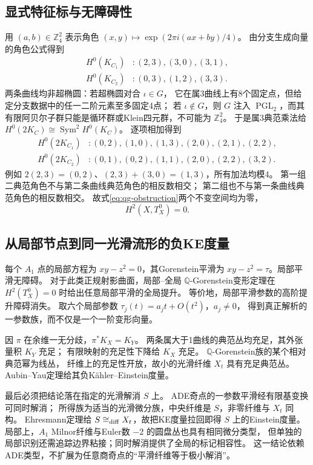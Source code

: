 \documentclass[UTF8,a4paper,11pt,fontset=fandol]{ctexart}
\numberwithin{equation}{section}
\theoremstyle{definition}
\newcommand{\Z}{\mathbb Z}
\begin{document}
\subsection{显式特征标与无障碍性}
用 $(a,b)\in\Z_4^2$ 表示角色
$(x,y)\mapsto\exp(2\pi i(ax+by)/4)$。
由分支生成向量的角色公式得到
\[
\begin{aligned}
H^0(K_{C_1}) &: (2,3),(3,0),(3,1),\\
H^0(K_{C_2}) &: (0,3),(1,2),(3,3).
\end{aligned}
\]
两条曲线均非超椭圆：若超椭圆对合 $\iota\in G$，
它在属3曲线上有8个固定点，但给定分支数据中的任一二阶元素至多固定4点；
若 $\iota\notin G$，则 $G$ 注入 $\operatorname{PGL}_2$，而其有限阿贝尔子群只能是循环群或Klein四元群，不可能为 $\Z_4^2$。
于是属3典范乘法给
$H^0(2K_C)\cong\operatorname{Sym}^2H^0(K_C)$。
逐项相加得到
\[
\begin{aligned}
H^0(2K_{C_1}) &: (0,2),(1,0),(1,3),(2,0),(2,1),(2,2),\\
H^0(2K_{C_2}) &: (0,1),(0,2),(1,1),(2,0),(2,2),(3,2).
\end{aligned}
\]
例如 $2(2,3)=(0,2)$、$(2,3)+(3,0)=(1,3)$，所有加法均模4。
第一组二典范角色不与第二条曲线典范角色的相反数相交；
第二组也不与第一条曲线典范角色的相反数相交。
故式\eqref{eq:qg-obstruction}两个不变空间均为零，
\begin{equation}\label{eq:H2zero}
H^2(X,T_X^0)=0.
\end{equation}

\subsection{从局部节点到同一光滑流形的负KE度量}
每个 $A_1$ 点的局部方程为 $xy-z^2=0$，其Gorenstein平滑为
$xy-z^2=\tau$。局部平滑无障碍。
对于此类正规射影曲面，局部--全局 $\mathbb Q$-Gorenstein变形定理在
$H^2(T_X^0)=0$ 时给出任意局部平滑的全局提升。
等价地，局部平滑参数的高阶提升障碍消失。
取六个局部参数 $\tau_j(t)=a_jt+O(t^2)$，$a_j\ne0$，
得到真正解析的一参数族，而不仅是一个一阶变形向量。

因 $\pi$ 在余维一无分歧，$\pi^*K_X=K_Y$。
两条属大于1曲线的典范丛均充足，其外张量积 $K_Y$ 充足；
有限映射的充足性下降给 $K_X$ 充足。
$\mathbb Q$-Gorenstein族的某个相对典范幂为线丛，
纤维上的充足性开放，故小的光滑纤维 $X_t$ 具有充足典范丛。
Aubin--Yau定理给其负K\"ahler--Einstein度量。

最后必须把结论落在指定的光滑解消 $S$ 上。
ADE奇点的一参数平滑经有限基变换可同时解消；
所得族为适当的光滑微分族，中央纤维是 $S$，非零纤维与 $X_t$ 同构。
Ehresmann定理给 $S\cong_{\rm diff}X_t$，故把KE度量拉回即得
$S$ 上的Einstein度量。
局部上，$A_1$ Milnor纤维与Euler数 $-2$ 的圆盘丛也具有相同微分类型，
但单独的局部识别还需追踪边界粘接；同时解消提供了全局的标记相容性。
这一结论依赖ADE类型，不扩展为任意商奇点的“平滑纤维等于极小解消”。
\end{document}

